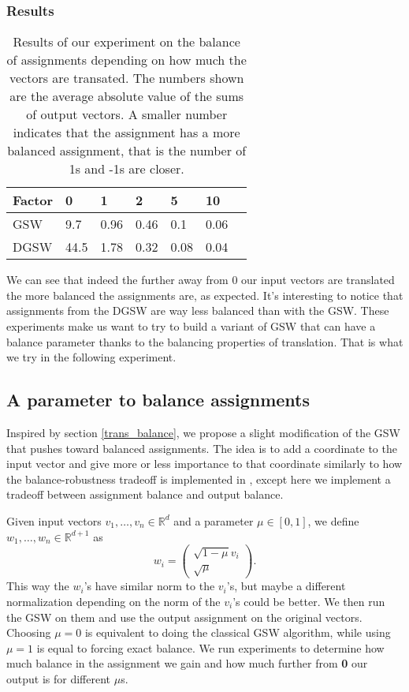 \documentclass[12pt]{article}
\begin{document}
\subsubsection{Results}
\begin{center}
\begin{table}[h]
\begin{tabular}{l|llllll}
 Factor & 0 & 1  & 2 & 5 & 10  \\
\hline
GSW  & 9.7 & 0.96 & 0.46 & 0.1 & 0.06 \\
DGSW & 44.5 & 1.78 & 0.32 & 0.08 & 0.04
\end{tabular}
\caption{Results of our experiment on the balance of assignments depending on how much the vectors are transated. The numbers shown are the average absolute value of the sums of output vectors. A smaller number indicates that the assignment has a more balanced assignment, that is the number of 1s and -1s are closer.}
\label{balance_when_translated}
\end{table}
\end{center}
We can see that indeed the further away from 0 our input vectors are translated the more balanced the assignments are, as expected. It's interesting to notice that assignments from the DGSW are way less balanced than with the GSW. These experiments make us want to try to build a variant of GSW that can have a balance parameter thanks to the balancing properties of translation. That is what we try in the following experiment.

\subsection{A parameter to balance assignments}\label{balance_parameter}
Inspired by section \ref{trans_balance}, we propose a slight modification of the GSW that pushes toward balanced assignments. The idea is to add a coordinate to the input vector and give more or less importance to that coordinate similarly to how the balance-robustness tradeoff is implemented in \cite{harshaw2019balancing}, except here we implement a tradeoff between assignment balance and output balance.

Given input vectors $v_1,\dots,v_n\in\mathbb{R}^d$ and a parameter $\mu\in[0,1]$, we define $w_1,\dots,w_n\in\mathbb{R}^{d+1}$ as $$w_i=\begin{pmatrix}\sqrt{1-\mu}v_i \\ \sqrt{\mu}\end{pmatrix}.$$ This way the $w_i$'s have similar norm to the $v_i$'s, but maybe a different normalization depending on the norm of the $v_i$'s could be better. We then run the GSW on them and use the output assignment on the original vectors. Choosing $\mu=0$ is equivalent to doing the classical GSW algorithm, while using $\mu=1$ is equal to forcing exact balance. We run experiments to determine how much balance in the assignment we gain and how much further from \textbf{0} our output is for different $\mu$s.
\end{document}
